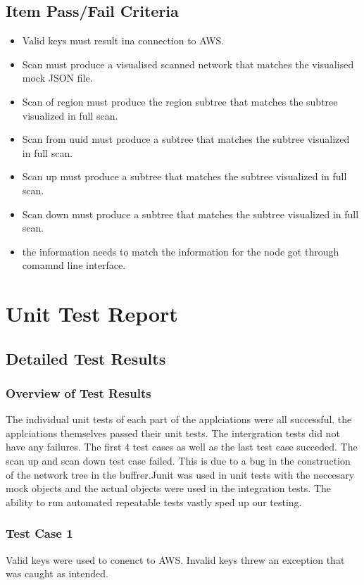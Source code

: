\documentclass[hidelinks,a4paper,12pt]{article}
\begin{document}
\subsection{Item Pass/Fail Criteria}

\begin{itemize}
\item Valid keys must result ina connection to AWS.
\item Scan must produce a visualised scanned network that matches the visualised mock JSON file.
\item Scan of region must produce the region subtree that matches the subtree visualized in full scan.
\item Scan from uuid must produce a  subtree that matches the subtree visualized in full scan.
\item Scan up  must produce a subtree that matches the subtree visualized in full scan.
\item Scan down  must produce a subtree that matches the subtree visualized in full scan.
\item the information needs to match the information for the node got through comamnd line interface.
\end{itemize}

\section{Unit Test Report}

\subsection{Detailed Test Results}
\subsubsection{Overview of Test Results}
The individual unit tests of each part of the applciations were all successful. the applciations themselves passed their unit tests. The intergration tests did not have any failures. The first 4  test cases as well as the last test case succeded. The scan up and scan down test case failed. This is due to a bug in the construction of the network tree in the buffrer.Junit was used in unit tests with the neccesary mock objects and the actual objects were used in the integration tests. The ability to run automated repeatable tests vastly sped up our testing.
\subsubsection{Test Case 1}
Valid keys were used to conenct to AWS. Invalid keys threw an exception that was caught as intended.
\end{document}
